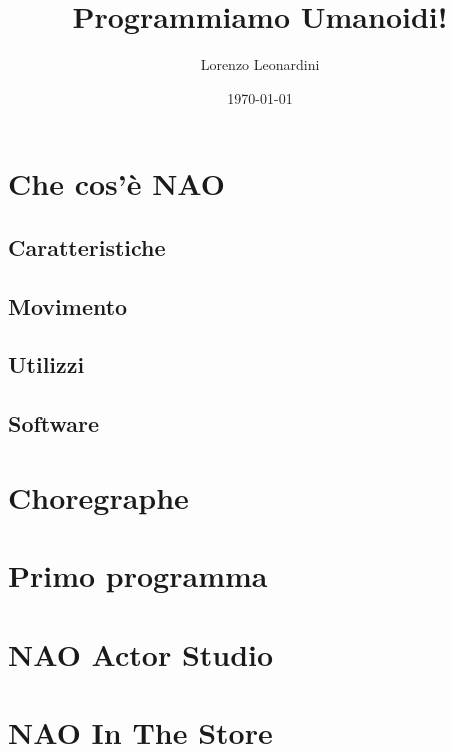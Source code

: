 \documentclass[aspectratio=169]{beamer}
\title{Programmiamo Umanoidi!}
\subtitle{}
\author{Lorenzo Leonardini}
\institute{Scuola di Robotica}
\date{\today}
\begin{document}
\begin{frame}
	\titlepage
\end{frame}

\section{Che cos'è NAO}
\subsection{Caratteristiche}
\subsection{Movimento}
\subsection{Utilizzi}
\subsection{Software}
\section{Choregraphe}
\section{Primo programma}
\section{NAO Actor Studio}

\fi

\section{NAO In The Store}
\end{document}
